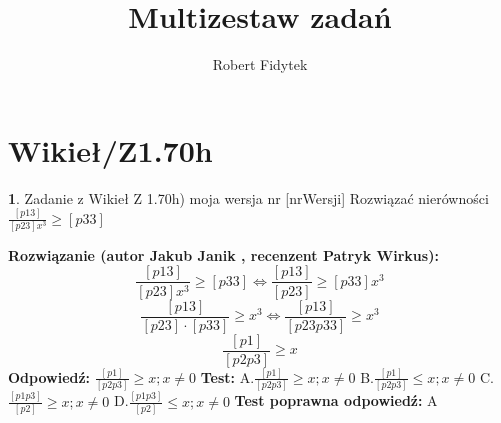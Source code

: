 \documentclass[12pt, a4paper]{article}
\title{Multizestaw zadań}
\author{Robert Fidytek}
\date{}
\theoremstyle{definition} %
\newtheorem{zad}{}
\newcommand{\kategoria}[1]{\section{#1}} %
\newcommand{\zadStart}[1]{\begin{zad}#1\newline} %
\newcommand{\zadStop}{\end{zad}}   %
\newcommand{\rozwStart}[2]{\noindent \textbf{Rozwiązanie (autor #1 , recenzent #2): }\newline} %
\newcommand{\rozwStop}{\newline}                                            %
\newcommand{\odpStart}{\noindent \textbf{Odpowiedź:}\newline}    %
\newcommand{\odpStop}{\newline}                                             %
\newcommand{\testStart}{\noindent \textbf{Test:}\newline} %
\newcommand{\testStop}{\newline} %
\newcommand{\kluczStart}{\noindent \textbf{Test poprawna odpowiedź:}\newline} %
\newcommand{\kluczStop}{\newline} %
\begin{document}
\maketitle


\kategoria{Wikieł/Z1.70h}
\zadStart{Zadanie z Wikieł Z 1.70h) moja wersja nr [nrWersji]}
Rozwiązać nierówności $\frac{[p13]}{[p23]x^3} \geq [p33]$
\zadStop
\rozwStart{Jakub Janik}{Patryk Wirkus}
$$\frac{[p13]}{[p23]x^3} \geq [p33] \Leftrightarrow \frac{[p13]}{[p23]} \geq [p33]x^3$$
$$\frac{[p13]}{[p23]\cdot[p33]} \geq x^3 \Leftrightarrow \frac{[p13]}{[p23p33]} \geq x^3$$
$$\frac{[p1]}{[p2p3]} \geq x$$
\rozwStop
\odpStart
$\frac{[p1]}{[p2p3]} \geq x; x \neq 0$
\odpStop
\testStart
A.$\frac{[p1]}{[p2p3]} \geq x; x \neq 0$
B.$\frac{[p1]}{[p2p3]} \leq x; x \neq 0$
C.$\frac{[p1p3]}{[p2]} \geq x; x \neq 0$
D.$\frac{[p1p3]}{[p2]} \leq x; x \neq 0$
\testStop
\kluczStart
A
\kluczStop
\end{document}

